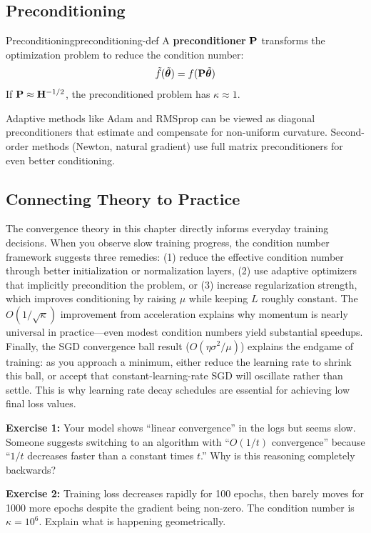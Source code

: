 \documentclass[../../main.tex]{subfiles}
\begin{document}
\subsection{Preconditioning}

\begin{definition}{Preconditioning}{preconditioning-def}
A \textbf{preconditioner} $\mathbf{P}$ transforms the optimization problem to reduce the condition number:
\[
    \tilde{f}(\tilde{\boldsymbol{\theta}}) = f(\mathbf{P}\tilde{\boldsymbol{\theta}})
\]
If $\mathbf{P} \approx \mathbf{H}^{-1/2}$, the preconditioned problem has $\kappa \approx 1$.
\end{definition}

\begin{intuition}
Adaptive methods like Adam and RMSprop can be viewed as diagonal preconditioners that estimate and compensate for non-uniform curvature. Second-order methods (Newton, natural gradient) use full matrix preconditioners for even better conditioning.
\end{intuition}

\subsection{Connecting Theory to Practice}

\begin{keyconcept}
The convergence theory in this chapter directly informs everyday training decisions. When you observe slow training progress, the condition number framework suggests three remedies: (1) reduce the effective condition number through better initialization or normalization layers, (2) use adaptive optimizers that implicitly precondition the problem, or (3) increase regularization strength, which improves conditioning by raising $\mu$ while keeping $L$ roughly constant. The $O(1/\sqrt{\kappa})$ improvement from acceleration explains why momentum is nearly universal in practice---even modest condition numbers yield substantial speedups. Finally, the SGD convergence ball result ($O(\eta\sigma^2/\mu)$) explains the endgame of training: as you approach a minimum, either reduce the learning rate to shrink this ball, or accept that constant-learning-rate SGD will oscillate rather than settle. This is why learning rate decay schedules are essential for achieving low final loss values.
\end{keyconcept}

\begin{whatbreaks}
\textbf{Exercise 1:} Your model shows ``linear convergence'' in the logs but seems slow. Someone suggests switching to an algorithm with ``$O(1/t)$ convergence'' because ``$1/t$ decreases faster than a constant times $t$.'' Why is this reasoning completely backwards?

\textbf{Exercise 2:} Training loss decreases rapidly for 100 epochs, then barely moves for 1000 more epochs despite the gradient being non-zero. The condition number is $\kappa = 10^6$. Explain what is happening geometrically.
\end{whatbreaks}
\end{document}
